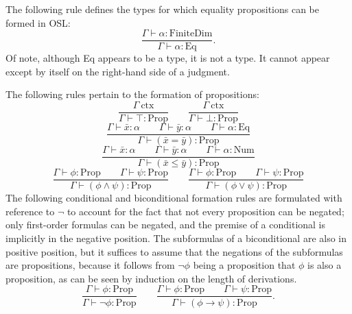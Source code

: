 \documentclass[11pt]{article}
\begin{document}
The following rule defines the types for which
equality propositions can be formed in OSL:
\begin{equation}
	\frac{\Gamma \vdash \alpha : \text{FiniteDim}}
	{\Gamma \vdash \alpha : \text{Eq}}.
\end{equation}
Of note, although Eq appears to be a type, it is not a type.
It cannot appear except by itself on the right-hand side of
a judgment.

The following rules pertain to the formation of propositions:
\begin{equation}
	\frac{\Gamma\ \text{ctx}}
	{\Gamma \vdash \top : \text{Prop}}
	\qquad
	\frac{\Gamma\ \text{ctx}}
	{\Gamma \vdash \bot : \text{Prop}}
\end{equation}
\begin{equation}
	\frac{\Gamma \vdash \bar{x} : \alpha
	\qquad \Gamma \vdash \bar{y} : \alpha
	\qquad \Gamma \vdash \alpha : \text{Eq}}
	{\Gamma \vdash (\bar{x} = \bar{y}) : \text{Prop}}
\end{equation}
\begin{equation}
	\frac{\Gamma \vdash \bar{x} : \alpha
	\qquad \Gamma \vdash \bar{y} : \alpha
	\qquad \Gamma \vdash \alpha : \text{Num}}
	{\Gamma \vdash (\bar{x} \leq \bar{y}) : \text{Prop}}
\end{equation}
\begin{equation}
	\frac{\Gamma \vdash \phi : \text{Prop}
	\qquad \Gamma \vdash \psi : \text{Prop}}
	{\Gamma \vdash (\phi \wedge \psi) : \text{Prop}}
	\qquad
	\frac{\Gamma \vdash \phi : \text{Prop}
	\qquad \Gamma \vdash \psi : \text{Prop}}
	{\Gamma \vdash (\phi \vee \psi) : \text{Prop}}
\end{equation}
The following conditional and biconditional formation rules are formulated
with reference to $\neg$ to account for the fact that not every proposition
can be negated; only first-order formulas can be negated, and the premise of
a conditional is implicitly in the negative position. The subformulas of a
biconditional are also in positive position, but it suffices to assume that
the negations of the subformulas are propositions, because it follows from
$\neg\phi$ being a proposition that $\phi$ is also a proposition, as can be
seen by induction on the length of derivations.
\begin{equation}
	\frac{\Gamma \vdash \phi : \text{Prop}}
	{\Gamma \vdash \neg\phi : \text{Prop}}
	\qquad
	\frac{\Gamma \vdash \phi : \text{Prop}
	\qquad \Gamma \vdash \psi : \text{Prop}}
	{\Gamma \vdash (\phi \to \psi) : \text{Prop}}.
\end{equation}
\end{document}
